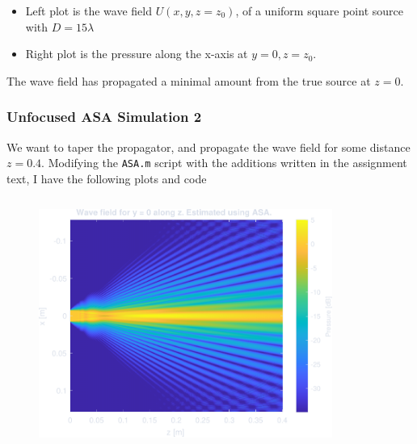 \documentclass[compress]{beamer}
\begin{document}
\begin{frame}
\begin{columns}
\begin{column}{0.5\textwidth}
\begin{figure}
            \end{figure}
        \end{column}
    \end{columns}
    \begin{itemize}
        \item Left plot is the wave field $U(x,y,z=z_0)$, of a uniform square point source with $D=15\lambda$
        \item Right plot is the pressure along the x-axis at $y = 0, z=z_0$.
    \end{itemize}
    The wave field has propagated a minimal amount from the true source at $z=0$.
\end{frame} %

\begin{frame}[fragile] %
    \frametitle{Unfocused ASA Simulation 2}
    We want to taper the propagator, and propagate the wave field for some distance $z=0.4$.
    Modifying the \texttt{ASA.m} script with the additions written in the assignment text,
    I have the following plots and code
    \begin{columns}
        \begin{column}{0.5\textwidth}
            \begin{figure}
                \includegraphics[width=\columnwidth]{"../2a.pdf"}
            \end{figure}
        \end{column}
        \begin{column}{0.5\textwidth}
            \begin{figure}

\end{figure}
\end{column}
\end{columns}
\end{frame}
\end{document}
